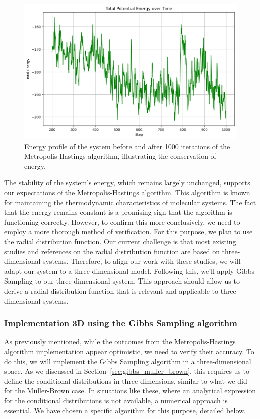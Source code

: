 \documentclass{report}
\begin{document}
\begin{figure}[H]
	\centering
	\includegraphics[width=0.75\linewidth]{./Figures/MCMC/LennardJones/energy.png}
	\caption{Energy profile of the system before and after 1000 iterations of the Metropolis-Hastings algorithm, illustrating the conservation of energy.}
	\label{fig:energymh}
\end{figure}

The stability of the system's energy, which remains largely unchanged, supports our expectations of the Metropolis-Hastings algorithm. This algorithm is known for maintaining the thermodynamic characteristics of molecular systems. The fact that the energy remains constant is a promising sign that the algorithm is functioning correctly. However, to confirm this more conclusively, we need to employ a more thorough method of verification. For this purpose, we plan to use the radial distribution function. Our current challenge is that most existing studies and references on the radial distribution function are based on three-dimensional systems. Therefore, to align our work with these studies, we will adapt our system to a three-dimensional model. Following this, we'll apply Gibbs Sampling to our three-dimensional system. This approach should allow us to derive a radial distribution function that is relevant and applicable to three-dimensional systems.


\subsubsection{Implementation 3D using the Gibbs Sampling algorithm}
\label{sec:lennard_jones_3d}

As previously mentioned, while the outcomes from the Metropolis-Hastings algorithm implementation appear optimistic, we need to verify their accuracy. To do this, we will implement the Gibbs Sampling algorithm in a three-dimensional space. As we discussed in Section~\ref{sec:gibbs_muller_brown}, this requires us to define the conditional distributions in three dimensions, similar to what we did for the Müller-Brown case. In situations like these, where an analytical expression for the conditional distributions is not available, a numerical approach is essential. We have chosen a specific algorithm for this purpose, detailed below.
\end{document}
